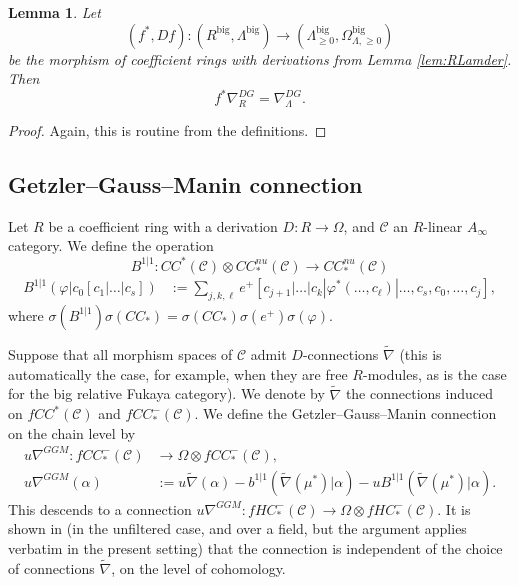 \documentclass{article}
\newtheorem{lem}{Lemma}[section]
\def\cC{\mathcal{C}}
\def\big{{\operatorname{big}}}
\begin{document}
\begin{lem}\label{lem:Rlamderconn}
    Let 
    $$(f^*,Df): (R^\big,\Lambda^\big) \to (\Lambda^\big_{\ge 0},\Omega^\big_{\Lambda,\ge 0})$$ 
    be the morphism of coefficient rings with derivations from Lemma \ref{lem:RLamder}. 
    Then 
    $$f^* \nabla^{DG}_R = \nabla^{DG}_\Lambda.$$
\end{lem}
\begin{proof}
    Again, this is routine from the definitions.
\end{proof}


\subsection{Getzler--Gauss--Manin connection}\label{sec:GGM}

Let $R$ be a coefficient ring with a derivation $D:R \to \Omega$, and $\cC$ an $R$-linear $A_\infty$ category. 
We define the operation
\[ B^{1|1}:CC^*(\cC) \otimes CC_*^{nu}(\cC) \to CC_*^{nu}(\cC)\]
\begin{align*}
 B^{1|1}(\varphi|c_0[c_1|\ldots|c_s]) &:= \sum_{j,k,\ell} e^+[c_{j+1}|\ldots|c_k|\varphi^*(\ldots,c_\ell)|\ldots,c_s,c_0,\ldots,c_j ],
\end{align*}
where $\sigma(B^{1|1}) \sigma(CC_*) = \sigma(CC_*) \sigma(e^+)\sigma(\varphi)$.

Suppose that all morphism spaces of $\cC$ admit $D$-connections $\tilde \nabla$ (this is automatically the case, for example, when they are free $R$-modules, as is the case for the big relative Fukaya category). 
We denote by $\tilde \nabla$ the connections induced on $fCC^*(\cC)$ and $fCC_*^-(\cC)$.  
We define the Getzler--Gauss--Manin connection on the chain level by 
\begin{align*}
u\nabla^{GGM}: fCC_*^{-}(\cC) & \to  \Omega \otimes fCC_*^{-}(\cC),\\
u\nabla^{GGM}(\alpha) &:= u\tilde \nabla(\alpha) - b^{1|1}(\tilde \nabla(\mu^*)|\alpha) - uB^{1|1}(\tilde\nabla(\mu^*)|\alpha). 
\end{align*} 
This descends to a connection
$u\nabla^{GGM}: fHC_*^-(\cC) \to \Omega \otimes fHC_*^-(\cC)$. 
It is shown in \cite{Sheridan_formulae} (in the unfiltered case, and over a field, but the argument applies verbatim in the present setting) that the connection is independent of the choice of connections $\tilde \nabla$, on the level of cohomology.
\end{document}

